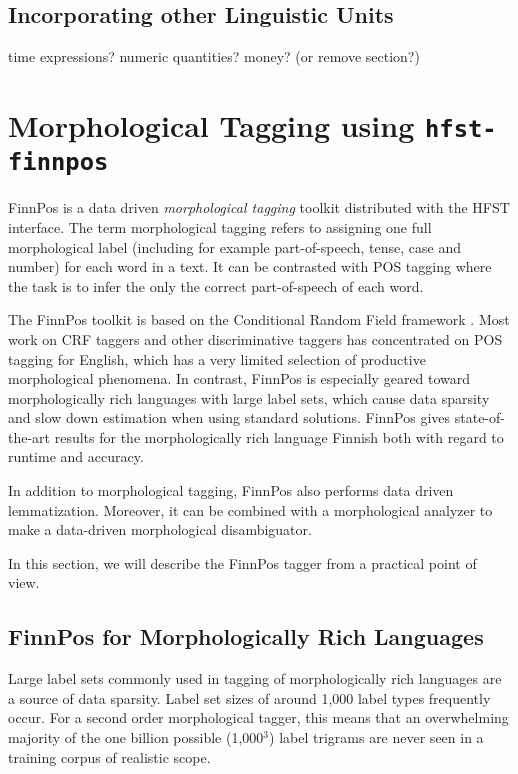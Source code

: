 \documentclass{llncs}
\begin{document}
\subsection{Incorporating other Linguistic Units}

time expressions? numeric quantities? money? (or remove section?)

\section{Morphological Tagging using {\tt hfst-finnpos}}\label{sec:morph-tagging}

FinnPos \cite{silfverberg/2015} is a data driven {\it morphological
  tagging} toolkit distributed with the HFST interface. The term
morphological tagging \cite{chrupala/2008} refers to assigning one full
morphological label (including for example part-of-speech, tense, case
and number) for each word in a text. It can be contrasted with POS
tagging where the task is to infer the only the correct part-of-speech
of each word.

The FinnPos toolkit is based on the Conditional Random Field framework
\cite{lafferty/2001}. Most work on CRF taggers and other discriminative
taggers has concentrated on POS tagging for English, which has a very
limited selection of productive morphological phenomena. In contrast,
FinnPos is especially geared toward morphologically rich languages
with large label sets, which cause data sparsity and slow down
estimation when using standard solutions. FinnPos gives
state-of-the-art results for the morphologically rich language Finnish
\cite{silfverberg/2015} both with regard to runtime and accuracy.

In addition to morphological tagging, FinnPos also performs data
driven lemmatization. Moreover, it can be combined with a
morphological analyzer to make a data-driven morphological
disambiguator.

In this section, we will describe the FinnPos tagger from a
practical point of view.

\subsection{FinnPos for Morphologically Rich Languages}

Large label sets commonly used in tagging of morphologically rich
languages are a source of data sparsity. Label set sizes of around
1,000 label types frequently occur. For a second order morphological
tagger, this means that an overwhelming majority of the one billion
possible (1,000$^3$) label trigrams are never seen in a training
corpus of realistic scope.
\end{document}
